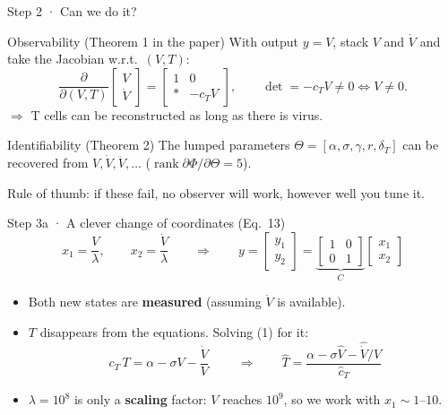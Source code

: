 \documentclass[aspectratio=169,11pt]{beamer}
\newcommand{\mnote}[1]{{\small\color{muted}#1}}
\begin{document}
\begin{frame}{Step 2 · Can we do it?}
\begin{block}{Observability (Theorem 1 in the paper)}
With output $y=V$, stack $V$ and $\dot V$ and take the Jacobian w.r.t.\ $(V,T)$:
\[
\frac{\partial}{\partial(V,T)}\begin{bmatrix} V \\ \dot V\end{bmatrix}
=\begin{bmatrix} 1 & 0\\ \ast & -c_T V\end{bmatrix},
\qquad \det = -c_T V \neq 0 \iff V\neq 0 .
\]
$\Rightarrow$ T cells can be reconstructed \alert{as long as there is virus}.
\end{block}
\begin{block}{Identifiability (Theorem 2)}
The lumped parameters $\Theta=[\alpha,\sigma,\gamma,r,\delta_T]$ can be recovered from $V,\dot V,\ddot V,\dots$ ($\operatorname{rank}\partial\Phi/\partial\Theta = 5$).
\end{block}
\mnote{Rule of thumb: if these fail, no observer will work, however well you tune it.}
\end{frame}

\begin{frame}{Step 3a · A clever change of coordinates (Eq.\ 13)}
\[
x_1 = \frac{V}{\lambda},\qquad x_2 = \frac{\dot V}{\lambda}
\qquad\Longrightarrow\qquad y = \begin{bmatrix} y_1\\ y_2\end{bmatrix} = \underbrace{\begin{bmatrix} 1&0\\0&1\end{bmatrix}}_{C}\begin{bmatrix} x_1\\ x_2\end{bmatrix}
\]
\begin{itemize}
  \item Both new states are \textbf{measured} (assuming $\dot V$ is available).
  \item $T$ disappears from the equations. Solving (1) for it:
  \[
     \boxed{\;c_T\,T = \alpha - \sigma V - \frac{\dot V}{V}\;}
     \qquad\Rightarrow\qquad \hat T = \frac{\alpha-\sigma\hat V-\hat{\dot V}/\hat V}{\hat c_T}
  \]
  \item $\lambda = 10^8$ is only a \textbf{scaling} factor: $V$ reaches $10^9$, so we work with $x_1\sim 1$--$10$.
\end{itemize}
\end{frame}
\end{document}
